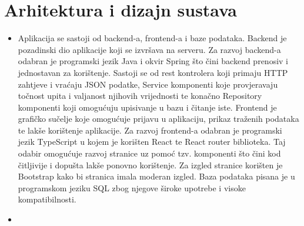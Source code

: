 \chapter{Arhitektura i dizajn sustava}
		

	\begin{itemize}
		\item 	%
		Aplikacija se sastoji od backend-a, frontend-a i baze podataka. \newline Backend je pozadinski dio aplikacije koji se izvršava na serveru. Za razvoj backend-a odabran je programski jezik Java i okvir Spring što čini backend prenosiv i jednostavan za korištenje. Sastoji se od rest kontrolera koji primaju HTTP zahtjeve i vraćaju JSON podatke, Service komponenti koje provjeravaju točnost upita i valjanost njihovih vrijednosti te konačno Repository komponenti koji omogućuju upisivanje u bazu i čitanje iste. \newline Frontend je grafičko sučelje koje omogućuje prijavu u aplikaciju, prikaz traženih podataka te lakše korištenje aplikacije. Za razvoj frontend-a odabran je programski jezik TypeScript u kojem je korišten React te React router biblioteka. Taj odabir omogućuje razvoj stranice uz pomoć tzv. komponenti što čini kod čitljivije i dopušta lakše ponovno korištenje. Za izgled stranice korišten je Bootstrap kako bi stranica imala moderan izgled. \newline Baza podataka pisana je u programskom jeziku SQL zbog njegove široke upotrebe i visoke kompatibilnosti.
		\item	%

\end{itemize}
